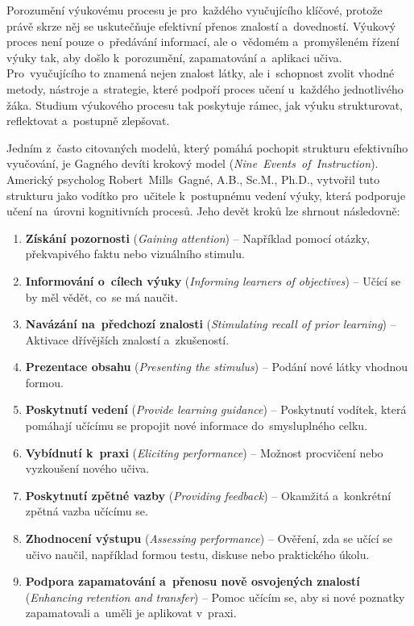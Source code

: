\documentclass[male,czech,api_bc]{kitheses}
\begin{document}
Porozumění výukovému procesu je pro~každého vyučujícího klíčové, protože právě skrze něj se uskutečňuje efektivní přenos znalostí a~dovedností. Výukový proces není pouze o~předávání informací, ale o~vědomém a~promyšleném řízení výuky tak, aby došlo k~porozumění, zapamatování a~aplikaci učiva. Pro~vyučujícího to znamená nejen znalost látky, ale i~schopnost zvolit vhodné metody, nástroje a~strategie, které podpoří proces učení u~každého jednotlivého žáka. Studium výukového procesu tak poskytuje rámec, jak výuku strukturovat, reflektovat a~postupně zlepšovat.

Jedním z~často citovaných modelů, který pomáhá pochopit strukturu efektivního vyučování, je Gagného devíti krokový model (\textit{Nine~Events~of~Instruction}). Americký psycholog \mbox{Robert~Mills~Gagné}, A.B., Sc.M., Ph.D., vytvořil tuto strukturu jako vodítko pro~učitele k~postupnému vedení výuky, která podporuje učení na~úrovni kognitivních procesů. Jeho devět kroků lze shrnout následovně:

\begin{enumerate}
	\item \textbf{Získání pozornosti} (\textit{Gaining attention}) – Například pomocí otázky, překvapivého faktu nebo vizuálního stimulu.
	\item \textbf{Informování o~cílech výuky} (\textit{Informing learners of objectives}) – Učící se by měl vědět, co~se má naučit.
	\item \textbf{Navázání na~předchozí znalosti} (\textit{Stimulating recall of prior learning}) – Aktivace dřívějších znalostí a~zkušeností.
	\item \textbf{Prezentace obsahu} (\textit{Presenting the stimulus}) – Podání nové látky vhodnou formou.
	\item \textbf{Poskytnutí vedení} (\textit{Provide learning guidance}) – Poskytnutí vodítek, která pomáhají učícímu se propojit nové informace do~smysluplného celku.
	\item \textbf{Vybídnutí k~praxi} (\textit{Eliciting performance}) – Možnost procvičení nebo vyzkoušení nového učiva.
	\item \textbf{Poskytnutí zpětné vazby} (\textit{Providing feedback}) – Okamžitá a~konkrétní zpětná vazba učícímu se.
	\item \textbf{Zhodnocení výstupu} (\textit{Assessing performance}) – Ověření, zda se učící se učivo naučil, například formou testu, diskuse nebo praktického úkolu.
	\item \textbf{Podpora zapamatování a~přenosu nově osvojených znalostí} (\textit{Enhancing retention and transfer}) – Pomoc učícím se, aby si nové poznatky zapamatovali a~uměli je aplikovat v~praxi.
\end{enumerate}
\end{document}
